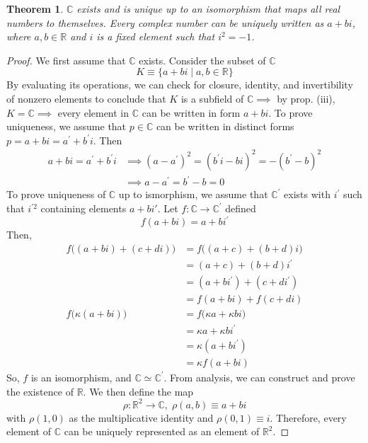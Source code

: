 \documentclass{article}
\newtheorem{theorem}{Theorem}[section]
\theoremstyle{remark}
\theoremstyle{definition}
\begin{document}
\begin{theorem}
$\mathbb{C}$ exists and is unique up to an isomorphism that maps all real numbers to themselves. Every complex number can be uniquely written as $a + bi$, where $a, b \in \mathbb{R}$ and $i$ is a fixed element such that $i^2 = -1$. 
\end{theorem}
\begin{proof}
We first assume that $\mathbb{C}$ exists. Consider the subset of $\mathbb{C}$
\[K \equiv \{ a + bi \; | \; a, b \in \mathbb{R}\} \]
By evaluating its operations, we can check for closure, identity, and invertibility of nonzero elements to conclude that $K$ is a subfield of $\mathbb{C} \implies$ by prop. (iii), $K = \mathbb{C} \implies$ every element in $\mathbb{C}$ can be written in form $a + bi$. To prove uniqueness, we assume that $p \in \mathbb{C}$ can be written in distinct forms $p = a + bi = a^{\prime} + b^\prime i$. Then
\begin{align*}
     a + bi = a^{\prime} + b^\prime i & \implies (a - a^\prime)^2 = (b^\prime i - b i)^2 = - (b^\prime - b)^2 \\
     & \implies a - a^\prime = b^\prime - b = 0
\end{align*}
To prove uniqueness of $\mathbb{C}$ up to ismorphism, we assume that $\mathbb{C}^\prime$ exists with $i^\prime$ such that $i^{\prime 2}$ containing elements $a + b i'$. Let $f: \mathbb{C} \longrightarrow \mathbb{C}^\prime$ defined 
\[ f( a + bi) = a + bi^\prime\]
Then, 
\begin{align*}
    f\big((a + b i) + (c + d i) \big) & = f\big( (a + c) + (b + d)i \big) \\
    & = (a + c) + (b + d) i^\prime \\
    & = (a + b i^\prime) + (c + d i^\prime) \\
    & = f(a + b i) + f( c + d i) \\
    f\big( \kappa (a + b i)\big) & = f\big( \kappa a + \kappa b i\big) \\
    & = \kappa a + \kappa b i^\prime \\
    & = \kappa (a + b i^\prime) \\
    & = \kappa f(a + b i)
\end{align*}
So, $f$ is an isomorphism, and $\mathbb{C} \simeq \mathbb{C}^\prime$. From analysis, we can construct and prove the existence of $\mathbb{R}$. We then define the map
\[ \rho: \mathbb{R}^2 \longrightarrow \mathbb{C}, \; \rho(a, b) \equiv a + bi\]
with $\rho(1, 0)$ as the multiplicative identity and $\rho(0,1) \equiv i$. Therefore, every element of $\mathbb{C}$ can be uniquely represented as an element of $\mathbb{R}^2$. 
\end{proof}
\end{document}
